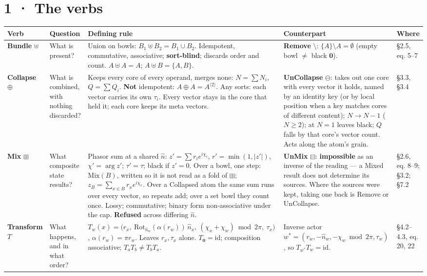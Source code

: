 \documentclass[10.5pt]{article}
\begin{document}
\section*{1 · The verbs}
{\small\setlength{\tabcolsep}{4pt}\begin{longtable}{L{2.2cm}L{2.4cm}L{6.0cm}L{3.6cm}L{1.6cm}}
\toprule
\textbf{Verb} & \textbf{Question} & \textbf{Defining rule} & \textbf{Counterpart} & \textbf{Where} \\
\midrule
\endhead
\textbf{Bundle} $\uplus$ & What is present? & Union on bowls: $B_1\uplus B_2=B_1\cup B_2$. Idempotent, commutative, associative; \textbf{sort-blind}; discards order and count. $A\uplus A=A$; $A\uplus B=\{A,B\}$. & \textbf{Remove} $\setminus$: $\{A\}\setminus A=\emptyset$ (empty bowl $\neq$ black $\mathbf 0$). & §2.5, eq. 5–7 \\
\textbf{Collapse} $\oplus$ & What is combined, with nothing discarded? & Keeps every core of every operand, merges none: $N=\sum N_i$, $Q=\sum Q_i$. \textbf{Not} idempotent: $A\oplus A=A^{\langle2\rangle}$. Any sorts: each vector carries its own $\tau_i$. Every vector stays in the core that held it; each core keeps its meta vectors. & \textbf{UnCollapse} $\ominus$: takes out one core with every vector it holds, named by an identity key (or by local position when a key matches cores of different content); $N\to N-1$ ($N\ge2$); at $N=1$ leaves black; $Q$ falls by that core's vector count. Acts along the atom's grain. & §3.3, §3.4 \\
\textbf{Mix} $\boxplus$ & What composite state results? & Phasor sum at a shared $\hat n$: $z'=\sum r_ie^{i\chi_i}$, $r'=\min(1,\lvert z'\rvert)$, $\chi'=\arg z'$; $\tau'=\tau$; black if $z'=0$. Over a bowl, one step: $\mathrm{Mix}(B)$, written so it is not read as a fold of $\boxplus$; $z_B=\sum_{x\in B}r_xe^{i\chi_x}$. Over a Collapsed atom the same sum runs over every vector, so repeats add; over a set bowl they count once. Lossy; commutative; binary form non-associative under the cap. \textbf{Refused} across differing $\hat n$. & \textbf{UnMix} $\boxminus$: \textbf{impossible} as an inverse of the reading — a Mixed result does not determine its sources. Where the sources were kept, taking one back is Remove or UnCollapse. & §2.6, eq. 8–9; §3.2; §7.2 \\
\textbf{Transform} $T$ & What happens, and in what order? & $T_w(x)=\bigl(r_x,\ \mathrm{Rot}_{\hat n_w}(\alpha(r_w))\,\hat n_x,\ (\chi_x+\chi_w)\bmod2\pi,\ \tau_x\bigr)$, $\alpha(r_w)=\pi r_w$. Leaves $r_x,\tau_x$ alone. $T_{\mathbf0}=\mathrm{id}$; composition associative; $T_aT_b\neq T_bT_a$. & Inverse actor $w^*=(r_w,-\hat n_w,-\chi_w\bmod2\pi,\tau_w)$, so $T_{w^*}T_w=\mathrm{id}$. & §4.2–4.3, eq. 20, 22 \\

\end{longtable}}
\end{document}
